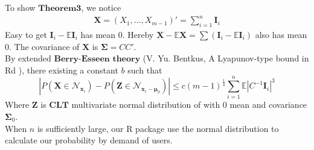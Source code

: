 \documentclass[12pt]{article}
\newcommand{\EE}{\mathbb{E}}
\newcommand{\Xmat}{\mathbf{X}}
\begin{document}
To show $\mathbf{Theorem 3}$, we notice
\begin{align*}
    \Xmat = (X_1,\dots,X_{m-1})' = \sum_{i=1}^{n} \boldsymbol{I}_{i}
\end{align*}
Easy to get $\boldsymbol{I}_i - \EE \boldsymbol{I}_i$ has mean 0. Hereby $\Xmat - \EE \Xmat = \sum (\boldsymbol{I}_i - \EE \boldsymbol{I}_i)$ also has mean 0. The covariance of $\Xmat$ is $\boldsymbol{\Sigma} = CC'$.\\
By extended $\textbf{Berry-Esseen theory}$ (V. Yu. Bentkus, A Lyapunov-type bound in Rd
), there existing  a constant $b$ such that
\begin{equation*}
    |P\left(\Xmat \in \mathcal{N}_{\boldsymbol{x}_i}\right) - P\left(\boldsymbol{Z} \in \mathcal{N}_{\boldsymbol{x}_i-\boldsymbol{\mu}_0} \right)| \leq c(m-1)^{\frac{1}{4}}\sum_{i=1}^{n} \EE \left|C^{-1}\boldsymbol{I}_i\right|^3
\end{equation*}
Where $\boldsymbol{Z}$ is $\textbf{CLT}$ multivariate normal distribution of with 0 mean and covariance $\boldsymbol{\Sigma}_0$.\\ When $n$ is sufficiently large, our R package use the normal distribution to calculate our probability by demand of users.


\end{document}
